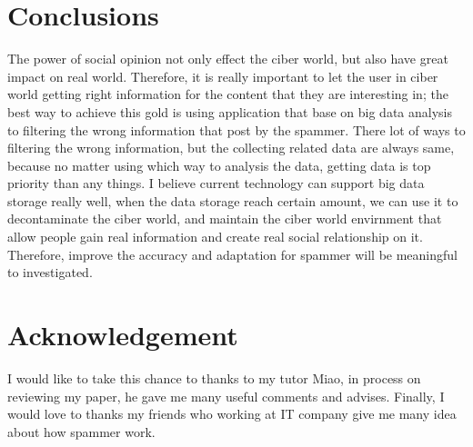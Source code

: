 \documentclass[sigconf]{acmart}
\begin{document}
\section{Conclusions}
The power of social opinion not only effect the ciber world, but also have great impact on real world. Therefore, it is really important to let the user in ciber world getting right information for the content that they are interesting in; the best way to achieve this gold is using application that base on big data analysis to filtering the wrong information that post by the spammer. There lot of ways to filtering the wrong information, but the collecting related data are always same, because no matter using which way to analysis the data, getting data is top priority than any things. I believe current technology can support big data storage really well, when the data storage reach certain amount, we can use it to decontaminate the ciber world, and maintain the ciber world envirnment that allow people gain real information and create real social relationship on it. Therefore, improve the accuracy and adaptation for spammer will be meaningful to investigated. 




\section{Acknowledgement}

I would like to  take this chance to thanks to my tutor Miao, in process on reviewing my paper, he gave me many useful comments and advises. Finally, I would love to thanks my friends who working at IT company  give me many idea about how spammer work.



 
\end{document}
